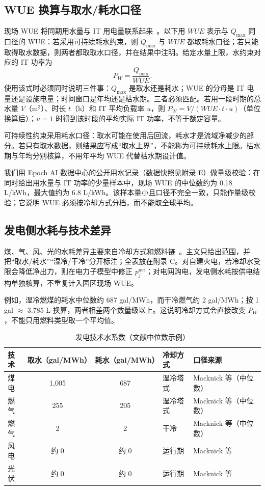 \documentclass{mcmthesis}
\begin{document}
\subsection{WUE 换算与取水/耗水口径}

现场 WUE 将同期用水量与 IT 用电量联系起来~\cite{mytton2021}。以下用 \(WUE\) 表示与 \(Q_{\max}\) 同口径的 WUE：若采用可持续耗水约束，则 \(Q_{\max}\) 与 \(WUE\) 都取耗水口径；若只能取得取水数据，则两者都取取水口径，并在结果中注明。给定水量上限，水约束对应的 IT 功率为
\begin{equation}
P_W=\frac{Q_{\max}}{WUE}.
\tag{11}
\end{equation}
使用该式时必须同时说明三件事：\(Q_{\max}\) 是取水还是耗水；WUE 的分母是 IT 电量还是设施电量；时间窗口是年均还是枯水期。三者必须匹配。若用一段时期的总水量 \(V\)（m\(^3\)）、时长 \(t\)（h）和 IT 平均负载率 \(u\)，则 \(P_W=V/(WUE\cdot t\cdot u)\)（单位换算后）；\(u=1\) 时得到该时段的平均实际 IT 功率，不等于额定容量。

可持续性约束采用耗水口径：取水可能在使用后回流，耗水才是流域净减少的部分。若只有取水数据，则结果应写成“取水上界”，不能称为可持续耗水上限。枯水期与年均分别核算，不用年平均 WUE 代替枯水期设计值。

我们用 Epoch AI 数据中心的公开用水记录（数据快照见附录 E）做量级校验：在同时给出用水量与 IT 功率的少量样本中，现场 WUE 的中位数约为 0.18 L/kWh，最大值约为 6.8 L/kWh。该样本量小且口径不完全一致，只能作量级校验；它说明 WUE 必须按冷却方式分档，而不能取全球平均。

\subsection{发电侧水耗与技术差异}

煤、气、风、光的水耗差异主要来自冷却方式和燃料链~\cite{macknick2012}。主文只给出范围，并把“取水/耗水”“湿冷/干冷”分开标注；全表放在附录 C。对自建火电，若冷却水受限会降低净出力，则在电力子模型中修正 \(p_j^{\mathrm{net}}\)；对电网购电，发电侧水耗按供电结构单独核算，不重复计入园区现场 WUE。

例如，湿冷燃煤的耗水中位数约 687 gal/MWh，而干冷燃气约 2 gal/MWh；按 1 gal \(\approx\) 3.785 L 换算，两者相差两个数量级以上。这说明冷却方式会直接改变 \(P_W\)，不能只用燃料类型取一个平均值。

\begin{table}[H]
\centering
\caption{发电技术水系数（文献中位数示例）}
\label{tab:water}
\small
\begin{tabularx}{\textwidth}{@{}l c c l X@{}}
\toprule
技术 & 取水（gal/MWh） & 耗水（gal/MWh） & 冷却方式 & 口径来源 \\
\midrule
煤电 & 1,005 & 687 & 湿冷塔式 & Macknick 等（中位数） \\
燃气 & 255 & 205 & 湿冷塔式 & Macknick 等（中位数） \\
燃气 & 2 & 2 & 干冷 & Macknick 等（中位数） \\
风电 & 约 0 & 约 0 & 运行期 & Macknick 等 \\
光伏 & 约 0 & 约 0 & 运行期 & Macknick 等 \\
\bottomrule
\end{tabularx}
\end{table}
\end{document}
